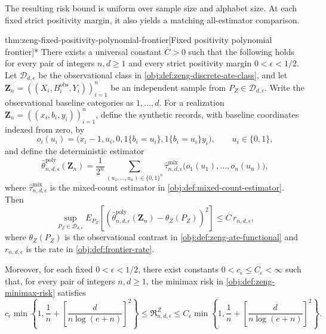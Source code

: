 The resulting risk bound is uniform over sample size and alphabet size. At each fixed strict positivity margin, it also yields a matching all-estimator comparison.
\begin{theoremv}{thm:zeng-fixed-positivity-polynomial-frontier}[Fixed positivity polynomial frontier]*
There exists a universal constant \(\overline C>0\) such that the following holds for every pair of integers \(n,d\ge1\) and every strict positivity margin \(0<\epsilon<1/2\). Let \(\mathcal D_{d,\epsilon}\) be the observational class in \cref{obj:def:zeng-discrete-ate-class}, and let \(\mathbf Z_n=((X_i,B_i^{\mathrm{obs}},Y_i))_{i=1}^n\) be an independent sample from \(P_Z\in\mathcal D_{d,\epsilon}\). Write the observational baseline categories as \(1,\ldots,d\). For a realization \(\mathbf Z_n=((x_i,b_i,y_i))_{i=1}^n\), define the synthetic records, with baseline coordinates indexed from zero, by
\[
o_i(u_i)
=
\bigl(x_i-1,u_i,0,1\{b_i=u_i\},1\{b_i=u_i\}y_i\bigr),
\qquad u_i\in\{0,1\},
\]
and define the deterministic estimator
\[
\widehat\theta^{\mathrm{poly}}_{n,d,\epsilon}(\mathbf Z_n)
=
\frac{1}{2^n}
\sum_{(u_1,\ldots,u_n)\in\{0,1\}^n}
\widehat\tau^{\mathrm{mix}}_{n,d,\epsilon}
\bigl(o_1(u_1),\ldots,o_n(u_n)\bigr),
\]
where \(\widehat\tau^{\mathrm{mix}}_{n,d,\epsilon}\) is the mixed-count estimator in \cref{obj:def:mixed-count-estimator}. Then
\[
\sup_{P_Z\in\mathcal D_{d,\epsilon}}
E_{P_Z}\!\left[
\left(
\widehat\theta^{\mathrm{poly}}_{n,d,\epsilon}(\mathbf Z_n)
-\theta_Z(P_Z)
\right)^2
\right]
\le
\overline C\,r_{n,d,\epsilon},
\]
where \(\theta_Z(P_Z)\) is the observational contrast in \cref{obj:def:zeng-ate-functional} and \(r_{n,d,\epsilon}\) is the rate in \cref{obj:def:frontier-rate}.

Moreover, for each fixed \(0<\epsilon<1/2\), there exist constants \(0<c_\epsilon\le C_\epsilon<\infty\) such that, for every pair of integers \(n,d\ge1\), the minimax risk in \cref{obj:def:zeng-minimax-risk} satisfies
\[
c_\epsilon
\min\left\{
1,\frac1n+
\left[\frac{d}{n\log(e+n)}\right]^2
\right\}
\le
\mathfrak R^Z_{n,d,\epsilon}
\le
C_\epsilon
\min\left\{
1,\frac1n+
\left[\frac{d}{n\log(e+n)}\right]^2
\right\}.
\]
\end{theoremv}

